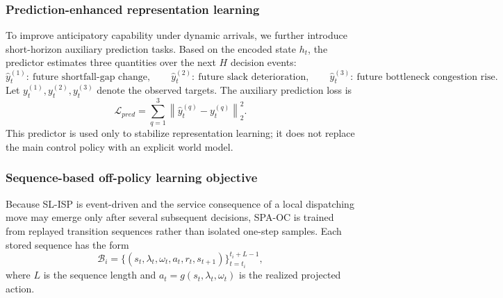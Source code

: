 \documentclass[a4paper,fleqn]{cas-sc}
\begin{document}
\subsubsection{Prediction-enhanced representation learning}

To improve anticipatory capability under dynamic arrivals, we further introduce short-horizon auxiliary prediction tasks. Based on the encoded state $h_t$, the predictor estimates three quantities over the next $H$ decision events:
\begin{equation}
\hat y_t^{(1)}:\ \text{future shortfall-gap change}, \qquad
\hat y_t^{(2)}:\ \text{future slack deterioration}, \qquad
\hat y_t^{(3)}:\ \text{future bottleneck congestion rise}.
\label{eq:prediction_targets}
\end{equation}
Let $y_t^{(1)},y_t^{(2)},y_t^{(3)}$ denote the observed targets. The auxiliary prediction loss is
\begin{equation}
\mathcal{L}_{pred}=
\sum_{q=1}^{3}
\left\|
\hat y_t^{(q)}-y_t^{(q)}
\right\|_2^2.
\label{eq:pred_loss}
\end{equation}
This predictor is used only to stabilize representation learning; it does not replace the main control policy with an explicit world model.

\subsubsection{Sequence-based off-policy learning objective}
\label{subsubsec:spa_training}

Because SL-ISP is event-driven and the service consequence of a local dispatching move may emerge only after several subsequent decisions, SPA-OC is trained from replayed transition sequences rather than isolated one-step samples. Each stored sequence has the form
\begin{equation}
\mathcal{B}_i=
\big\{
(s_t,\lambda_t,\omega_t,a_t,r_t,s_{t+1})
\big\}_{t=t_i}^{t_i+L-1},
\label{eq:seq_buffer}
\end{equation}
where $L$ is the sequence length and $a_t=g(s_t,\lambda_t,\omega_t)$ is the realized projected action.
\end{document}
